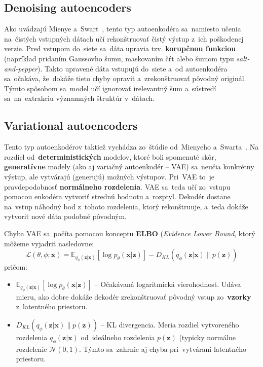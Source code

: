 \subsection{Denoising autoencoders}
Ako uvádzajú Mienye a~Swart~\cite{mienye2025deep}, tento typ autoenkodéra sa~namiesto učenia na~čistých vstupných dátach učí rekonštruovať čistý výstup z~ich poškodenej verzie. Pred vstupom do~siete sa~dáta upravia tzv. \textbf{korupčnou funkciou} (napríklad pridaním Gaussovho šumu, maskovaním čŕt alebo šumom typu \textit{salt-and-pepper}). Takto upravené dáta vstupujú do~siete a~od autoenkodéra sa~očakáva, že~dokáže tieto chyby opraviť a~zrekonštruovať pôvodný originál. Týmto spôsobom sa~model učí ignorovať irelevantný šum a~sústredí sa~na~extrakciu významných štruktúr v~dátach.

\subsection{Variational autoencoders}
Tento typ autoenkodérov taktiež vychádza zo~štúdie od~Mienyeho a~Swarta~\cite{mienye2025deep}.
Na rozdiel od~\textbf{deterministických} modelov, ktoré boli spomenuté skôr, \textbf{generatívne} modely (ako aj variačný autoenkodér -- VAE) sa~neučia konkrétny výstup, ale vytvárajú (generujú) možných výstupov. Pri~VAE to~je pravdepodobnosť \textbf{normálneho rozdelenia}. VAE sa~teda učí zo~vstupu pomocou enkodéra vytvoriť strednú hodnotu a~rozptyl. Dekodér dostane na~vstup náhodný bod z~tohoto rozdelenia, ktorý rekonštruuje, a~teda dokáže vytvoriť nové dáta podobné pôvodným.

Chyba VAE sa~počíta pomocou konceptu \textbf{ELBO} (\textit{Evidence Lower Bound}, ktorý môžeme vyjadriť nasledovne: 
\begin{equation}
    \mathcal{L}(\theta, \phi; \mathbf{x}) = 
    \mathbb{E}_{q_\phi(\mathbf{z}|\mathbf{x})} [\log p_\theta(\mathbf{x}|\mathbf{z})] 
    - 
    D_{KL}(q_\phi(\mathbf{z}|\mathbf{x}) \parallel p(\mathbf{z}))
\end{equation}
pričom: 
\begin{itemize}
    \item $\mathbb{E}_{q_\phi(\mathbf{z}|\mathbf{x})} [\log p_\theta(\mathbf{x}|\mathbf{z})]$ -- Očakávaná logaritmická vierohodnosť. Udáva mieru, ako dobre dokáže dekodér zrekonštruovať pôvodný vstup zo~\textbf{vzorky} z~latentného priestoru.
    \item $D_{KL}(q_\phi(\mathbf{z}|\mathbf{x}) \parallel p(\mathbf{z}))$ -- KL divergencia. Meria rozdiel vytvoreného rozdelenia $q_\phi(\mathbf{z}|\mathbf{x})$ od~ideálneho rozdelenia $p(\mathbf{z})$ (typicky normálne rozdelenie $\mathcal{N}(0,1)$. Týmto sa~zahrnie aj chyba pri~vytváraní latentného priestoru.
\end{itemize}

